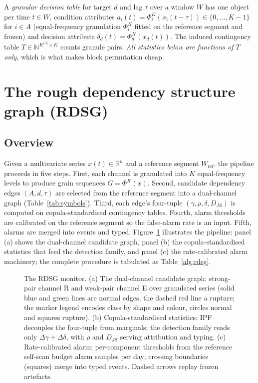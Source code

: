 \documentclass[11pt,a4paper]{article}
\newcommand{\RDSG}{RDSG}
\begin{document}
A \emph{granular decision table} for target $d$ and lag $\tau$ over a window
$W$ has one object per time $t\in W$, condition attributes
$a_i(t)=\Phi^K_i(x_i(t-\tau))\in\{0,\dots,K-1\}$ for $i\in A$ (equal-frequency
granulation $\Phi^K_i$ fitted on the reference segment and frozen) and
decision attribute $\delta_d(t)=\Phi^K_d(x_d(t))$. The induced contingency
table $T\in\mathbb{N}^{K^{|A|}\times K}$ counts granule pairs. \emph{All
statistics below are functions of $T$ only}, which is what makes block
permutation cheap.

\section{The rough dependency structure graph (RDSG)}\label{sec:method}

\subsection{Overview}\label{sec:overview}
Given a multivariate series $x(t) \in \mathbb{R}^n$ and a reference
segment $W_{\mathrm{ref}}$, the pipeline proceeds in five steps.
First, each channel is granulated into $K$ equal-frequency levels to
produce grain sequences $G = \Phi^K(x)$.
Second, candidate dependency edges $(A, d, \tau)$ are selected from the
reference segment into a dual-channel graph (Table~\ref{tab:symbols}).
Third, each edge's four-tuple $(\gamma, \rho, \delta, D_{JS})$ is
computed on copula-standardised contingency tables.
Fourth, alarm thresholds are calibrated on the reference segment so the
false-alarm rate is an input.
Fifth, alarms are merged into events and typed.
Figure~\ref{fig:pipeline} illustrates the pipeline: panel (a) shows the dual-channel candidate graph, panel (b) the copula-standardised statistics that feed the detection family, and panel (c) the rate-calibrated alarm machinery; the complete procedure is tabulated as Table~\ref{alg:rdsg}.

\begin{figure}[t]\centering\caption{The \RDSG{} monitor. (a) The dual-channel candidate graph: strong-pair channel R and weak-pair channel E over granulated series (solid blue and green lines are normal edges, the dashed red line a rupture; the marker legend encodes class by shape and colour, circles normal and squares rupture). (b) Copula-standardised statistics: IPF decouples the four-tuple from marginals; the detection family reads only $\Delta\gamma+\Delta\delta$, with $\rho$ and $D_{JS}$ serving attribution and typing. (c) Rate-calibrated alarm: per-component thresholds from the reference self-scan budget alarm samples per day; crossing boundaries (squares) merge into typed events. Dashed arrows replay frozen artefacts.}
\label{fig:pipeline}
\end{figure}
\end{document}
